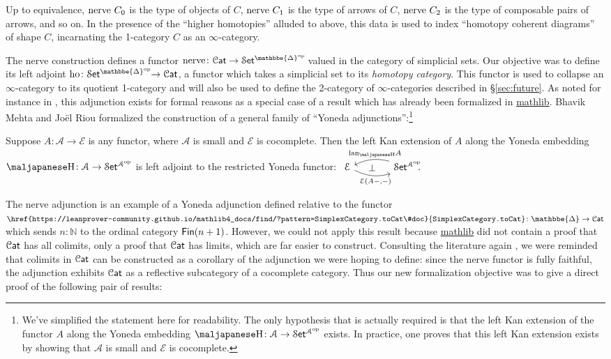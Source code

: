 \documentclass[a4paper,UKenglish,cleveref, autoref, thm-restate]{lipics-v2021}
\newcommand{\op}{\textup{op}}
\newcommand{\ho}{\textup{ho}}
\newcommand{\nerve}{\textup{nerve}}
\newcommand{\lan}{\textup{lan}}
\newcommand{\cat}[1]{\textup{\textsf{#1}}}%
\newcommand{\NN}{\mathbb{N}}
\newcommand{\1}{\mathbbe{1}}
\newcommand{\2}{\mathbbe{2}}
\newcommand{\3}{\mathbbe{3}}
\newcommand{\cA}{\mathcal{A}}
\newcommand{\cE}{\mathcal{E}}
\newcommand{\DDelta}{\mathbbe{\Delta}}
\newcommand{\Fin}{\cat{Fin}}
\newcommand{\Cat}{\mathcal{C}\cat{at}}
\newcommand{\Set}{\mathcal{S}\cat{et}}
\def\yo{\textrm{\maljapanese\char"48}}
\newcommand{\libmathlib}{\href{https://github.com/leanprover-community/mathlib}{\textsf{mathlib}}}
\newcommand{\ldoc}[2][]{\href{https://leanprover-community.github.io/mathlib4_docs/find/?pattern=#1#2\#doc}{\texttt{#2}}}
\newcommand{\cdoc}[2][]{\href{https://leanprover-community.github.io/mathlib4_docs/find/?pattern=CategoryTheory.#1#2\#doc}{\texttt{#2}}}
\begin{document}
Up to equivalence, $\nerve\ C_0$ is the type of objects of $C$, $\nerve\ C_1$ is the type of arrows of $C$, $\nerve\ C_2$ is the type of composable pairs of arrows, and so on. In the presence of the ``higher homotopies'' alluded to above, this data is used to index ``homotopy coherent diagrams'' of shape $C$, incarnating the 1-category $C$ as an $\infty$-category.

The nerve construction defines a functor $\nerve \colon \Cat \to \Set^{\DDelta^\op}\!$ valued in the category of simplicial sets. Our objective was to define its left adjoint $\ho \colon \Set^{\DDelta^\op}\!\! \to \Cat$, a functor which takes a simplicial set to its \emph{homotopy category}. This functor is used to collapse an $\infty$-category to its quotient 1-category and will also be used to define the 2-category of $\infty$-categories described in \S\ref{sec:future}. As noted for instance in \cite[6.5.iv]{Riehl:2016cc}, this adjunction exists for formal reasons as a special case of a result which has already been formalized in \libmathlib{}. Bhavik Mehta and Jo\"{e}l Riou formalized the construction of a general family of ``Yoneda adjunctions'':\footnote{We've simplified the statement here for readability. The only hypothesis that is actually required is that the left Kan extension of the functor $A$ along the Yoneda embedding $\yo \colon \cA \to \Set^{\cA^\op}$ exists. In practice, one proves that this left Kan extension exists by showing that $\cA$ is small and $\cE$ is cocomplete.}

\begin{theorem}[\cdoc{Presheaf.yonedaAdjunction}] Suppose $A \colon \cA \to \cE$ is any functor,  where $\cA$ is small and $\cE$ is cocomplete.
 Then the left Kan extension of $A$ along the Yoneda embedding $\yo \colon \cA \to \Set^{\cA^\op}$ is left adjoint to the restricted Yoneda functor:
  $ \begin{tikzcd}[column sep=large] \cE \arrow[r, bend right=20, "{\cE(A-,-)}"' pos=.6] \arrow[r, phantom, "\bot"] & \Set^{\cA^\op}\!\!. \arrow[l, bend right=20, "{\lan_{\yo}A}"' pos=.4]
  \end{tikzcd}$
\end{theorem}

The nerve adjunction is an example of a Yoneda adjunction defined relative to the functor $\ldoc{SimplexCategory.toCat} \colon \DDelta \to \Cat$ which sends $n : \NN$ to the ordinal category $\Fin(n+1)$. However, we could not apply this result because \libmathlib{} did not contain a proof that $\Cat$ has all colimits, only a proof that $\Cat$ has limits, which are far easier to construct.  Consulting the literature again \cite[4.5.16]{Riehl:2016cc}, we were reminded that colimits in $\Cat$ can be constructed as a corollary of the adjunction we were hoping to define: since the nerve functor is fully faithful, the adjunction exhibits $\Cat$ as a reflective subcategory of a cocomplete category. Thus our new formalization objective was to give a direct proof of the following pair of results:
\end{document}
